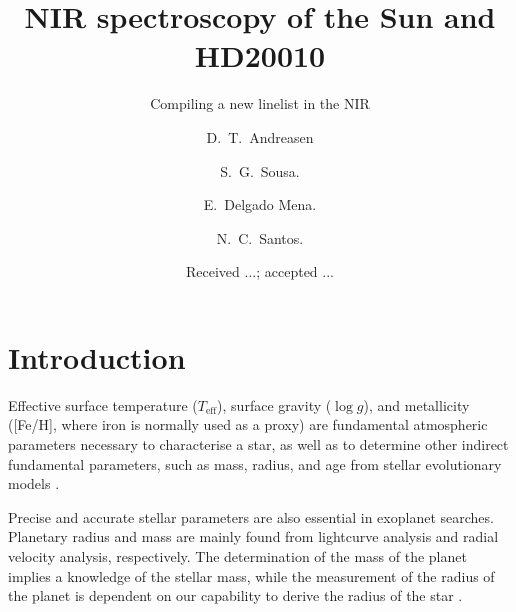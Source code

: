 \documentclass{aa}
\begin{document}
\title{NIR spectroscopy of the Sun and HD20010}
\subtitle{Compiling a new linelist in the NIR}


\author{D.~T.~Andreasen
    \and S.~G.~Sousa.
    \and E.~Delgado Mena.
    \and N.~C.~Santos.}









\date{Received ...; accepted ...}

\abstract{}{}{}{}



\maketitle



\section{Introduction}
\label{sec:introduction}

Effective surface temperature ($T_\mathrm{eff}$), surface gravity
($\log g$), and metallicity ([Fe/H], where iron is normally used
as a proxy) are fundamental atmospheric parameters necessary to
characterise a star, as well as to determine other indirect fundamental
parameters, such as mass, radius, and age from stellar evolutionary
models \citep{Girardi2000}.

Precise and accurate stellar parameters are also essential in
exoplanet searches. Planetary radius and mass are mainly found from
lightcurve analysis and radial velocity analysis, respectively. The
determination of the mass of the planet implies a knowledge of the
stellar mass, while the measurement of the radius of the planet
is dependent on our capability to derive the radius of the star
\citep{Ammler2009,Torres2008,Torres2012}.
\end{document}
